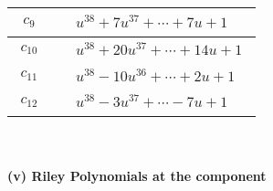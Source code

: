 \documentclass[1p]{elsarticle_modified}
\theoremstyle{definition}
\begin{document}
\begin{tabular}{m{50pt}|m{274pt}}
\hline $$\begin{aligned}c_{9}\end{aligned}$$&$\begin{aligned}
&u^{38}+7 u^{37}+\cdots+7 u+1
\end{aligned}$\\
\hline $$\begin{aligned}c_{10}\end{aligned}$$&$\begin{aligned}
&u^{38}+20 u^{37}+\cdots+14 u+1
\end{aligned}$\\
\hline $$\begin{aligned}c_{11}\end{aligned}$$&$\begin{aligned}
&u^{38}-10 u^{36}+\cdots+2 u+1
\end{aligned}$\\
\hline $$\begin{aligned}c_{12}\end{aligned}$$&$\begin{aligned}
&u^{38}-3 u^{37}+\cdots-7 u+1
\end{aligned}$\\
\hline
\end{tabular}\\~\\
\newpage\renewcommand{\arraystretch}{1}
\flushleft \textbf{(v) Riley Polynomials at the component}\newline \\
\end{document}
